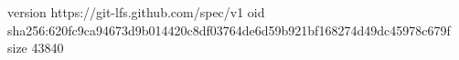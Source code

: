 version https://git-lfs.github.com/spec/v1
oid sha256:620fc9ca94673d9b014420c8df03764de6d59b921bf168274d49dc45978c679f
size 43840
